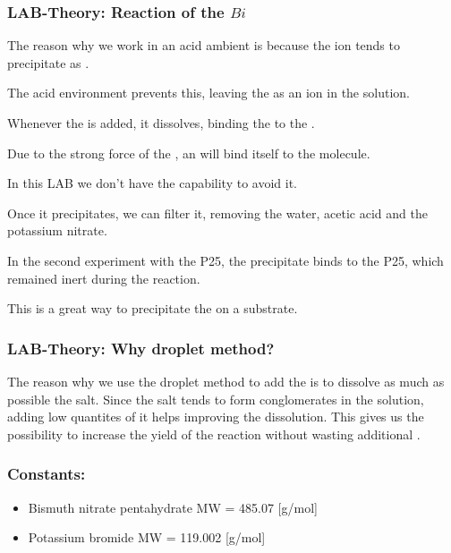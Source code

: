 \newpage

\subsubsection{LAB-Theory: Reaction of the $Bi$} 

The reason why we work in an acid ambient is because the  ion tends to precipitate as . 

\noindent The acid environment prevents this, leaving the  as an ion in the solution.

\noindent Whenever the  is added, it dissolves, binding the  to the . 

\noindent Due to the strong force of the , an  will bind itself to the molecule. 

\noindent In this LAB we don't have the capability to avoid it. 

\noindent Once it precipitates, we can filter it, removing the water, acetic acid and the potassium nitrate. 

\noindent In the second experiment with the P25, the precipitate binds to the P25, which remained inert during the reaction. 

\noindent This is a great way to precipitate the  on a substrate.

\subsubsection{LAB-Theory: Why droplet method?} 

The reason why we use the droplet method to add the  is to dissolve as much as possible the salt.
Since the salt tends to form conglomerates in the solution, adding low quantites of it helps improving the dissolution.
This gives us the possibility to increase the yield of the reaction without wasting additional .

\newpage

\subsubsection{Constants:}

\begin{itemize}
    \item Bismuth nitrate pentahydrate MW = 485.07 [g/mol]
    \item Potassium bromide MW = 119.002 [g/mol]
\end{itemize}

